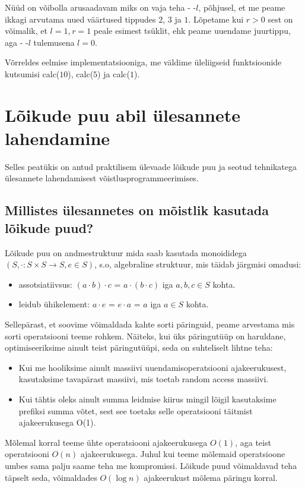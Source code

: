 \documentclass{trkut}
\begin{document}
Nüüd on võibolla arusaadavam miks on vaja teha - -$l$, põhjusel, et me peame ikkagi arvutama uued väärtused tippudes $2$, $3$ ja $1$.
Lõpetame kui $r > 0$ sest on võimalik, et $l = 1$, $r = 1$ peale esimest tsüklit, ehk peame uuendame juurtippu, aga - -$l$ tulemusena $l = 0$.

Võrreldes eelmise implementatsiooniga, me väldime üleliigseid funktsioonide kutsumisi calc($10$), calc($5$) ja calc($1$).




\chapter{Lõikude puu abil ülesannete lahendamine}
Selles peatükis on antud praktilisem ülevaade lõikude puu ja seotud tehnikatega ülesannete lahendamisest võistlusprogrammeerimises.

\section{Millistes ülesannetes on mõistlik kasutada lõikude puud?} 
Lõikude puu on andmestruktuur mida saab kasutada monoididega $(S, \cdot: S \times S \to S, e \in S)$, s.o, algebraline struktuur, mis täidab järgmisi omadusi:
\begin{itemize}
    \item assotsiatiivsus: $(a \cdot b) \cdot c$ = $a \cdot (b \cdot c)$ iga $a, b, c \in S$ kohta.
    \item leidub ühikelement: $a \cdot e$ = $e \cdot a$ = $a$ iga $a \in S$ kohta.
\end{itemize}

Sellepärast, et soovime võimaldada kahte sorti päringuid, peame arvestama mis sorti operatsiooni teeme rohkem. Näiteks, kui üks päringutüüp on haruldane, optimiseeriksime ainult teist päringutüüpi, seda on suhteliselt lihtne teha:

\begin{itemize}
    \item Kui me hooliksime ainult massiivi uuendamisoperatsiooni ajakeerukusest, kasutaksime tavapärast massiivi, mis toetab random access massiivi.
    \item Kui tähtis oleks ainult summa leidmise kiirus mingil lõigil kasutaksime prefiksi summa võtet, sest see toetaks selle operatsiooni täitmist ajakeerukusega O(1).
\end{itemize}

Mõlemal korral teeme ühte operatsiooni ajakeerukusega $O(1)$, aga teist operatsiooni $O(n)$ ajakeerukusega. Juhul kui teeme mõlemaid operatsioone umbes sama palju saame teha me kompromissi. Lõikude puud võimaldavad teha täpselt seda, võimaldades $O(\log n)$ ajakeerukust mõlema päringu korral.
\end{document}
